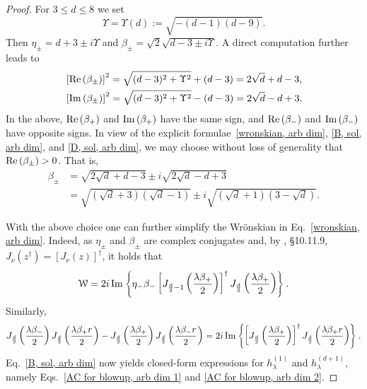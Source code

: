 \documentclass[11pt,a4paper,english,reqno]{amsart}
\theoremstyle{plain}
\newcommand{\1}{\mathbbm{1}}
\begin{document}
\begin{proof}
For $3\leq d \leq 8$ we set
\begin{equation*}
\Upsilon=\Upsilon(d) := \sqrt{-(d-1)(d-9)}. 
\end{equation*}
Then $\eta_\pm = d+3 \pm i\Upsilon$ and $\beta_\pm = \sqrt{2} \sqrt{d-3\pm i \Upsilon}$. A direct computation further leads to
\begin{align}\label{Re and Im parts of beta pm}
&\left[{\rm Re}\left({\beta_\pm}\right)\right]^2 = \sqrt{(d-3)^2+\Upsilon^2} + (d-3) = 2\sqrt{d}+d-3,\\
&\left[{\rm Im}\left({\beta_\pm}\right)\right]^2 = \sqrt{(d-3)^2+\Upsilon^2} - (d-3) = 2\sqrt{d}-d+3.
\end{align}
In the above, ${\rm Re}\left({\beta_+}\right)$ and ${\rm Im}\left({\beta_+}\right)$ have the same sign, and ${\rm Re}\left({\beta_-}\right)$ and ${\rm Im}\left({\beta_-}\right)$ have opposite signs. In view of the explicit formulae~\eqref{wronskian, arb dim}, \eqref{B, sol, arb dim}, and  \eqref{D, sol, arb dim}, we may choose without loss of generality that ${\rm Re}\left({\beta_\pm}\right)>0$. That is,
\begin{align}
\beta_\pm &= \sqrt{2\sqrt{d}+d-3} \pm i \sqrt{2\sqrt{d}-d+3}\nonumber\\
&= \sqrt{\left(\sqrt{d}+3\right)\left(\sqrt{d}-1\right)} \pm i \sqrt{\left(\sqrt{d}+1\right)\left(3-\sqrt{d}\right)}.
\end{align}


With the above choice one can further simplify the Wr\"{o}nskian in Eq.~\eqref{wronskian, arb dim}.  Indeed, as $\eta_\pm$ and $\beta_\pm$ are complex conjugates and, by \cite{lozier2003nist}, \S 10.11.9, $J_\nu\left(z^\dagger\right) = \left[J_\nu(z)\right]^\dagger$, it holds that
\begin{equation}\label{wronskian, purely imaginary}
\mathcal{W} = 2i\,{\rm Im}\left\{\eta_-\beta_-\left[J_{\frac{d}{2}-1}\left(\frac{\lambda\beta_+}{2}\right)\right]^\dagger J_{\frac{d}{2}}\left(\frac{\lambda\beta_+}{2}\right) \right\}.
\end{equation}
Similarly,
\begin{align*}
J_{\frac{d}{2}}\left(\frac{\lambda\beta_-}{2}\right) J_{\frac{d}{2}}\left( \frac{\lambda  \beta_+ r}{2}\right) - J_{\frac{d}{2}}\left(\frac{\lambda\beta_+}{2}\right) J_{\frac{d}{2}}\left( \frac{\lambda \beta_- r}{2}\right) = 2i\,{\rm Im}\left\{\left[J_{\frac{d}{2}}\left(\frac{\lambda\beta_+}{2}\right)\right]^\dagger J_{\frac{d}{2}}\left(\frac{\lambda\beta_+ r}{2}\right) \right\}.
\end{align*}
Eq.~\eqref{B, sol, arb dim} now yields closed-form expressions for $h_{\lambda}^{(1)}$ and $h_{\lambda}^{(d+1)}$, namely Eqs.~\eqref{AC for blowup, arb dim 1} and \eqref{AC for blowup, arb dim 2}.   \end{proof}
\end{document}
